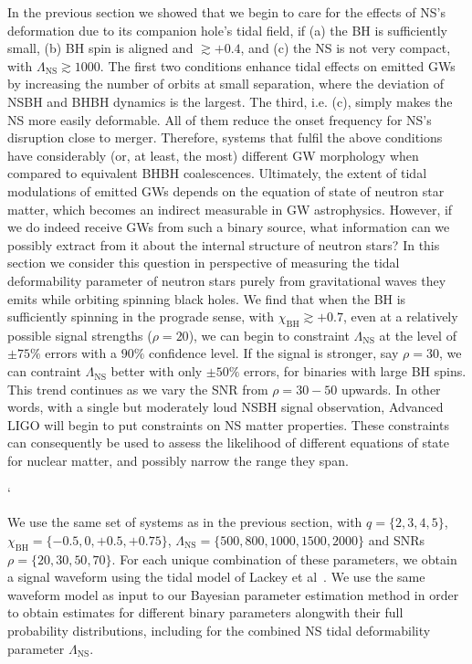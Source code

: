 \documentclass[aps,prd,amsmath,floats,floatfix, twocolumn,
superscriptaddress,nofootinbib,showpacs]{revtex4-1}
\newcommand{\lambdans}{\Lambda_\mathrm{NS}}
\newcommand{\chibh}{\chi_\mathrm{BH}}
\begin{document}
%
% 
In the previous section we showed that we begin to care for the effects of NS's
deformation due to its companion hole's tidal field, if (a) the BH is sufficiently
small, (b) BH spin is aligned and $\gtrsim +0.4$, and (c) the NS is
not very compact, with $\lambdans\gtrsim 1000$. The first two conditions
enhance tidal effects on emitted GWs by increasing the number of orbits at small
separation, where the deviation of NSBH and BHBH dynamics is the largest. The third,
i.e. (c), simply makes the NS more easily deformable. All of them reduce the onset 
frequency for NS's disruption close to merger. Therefore, systems that fulfil the 
above conditions have considerably (or, at least, the most) different GW morphology
when compared to equivalent BHBH coalescences. Ultimately, the extent of 
tidal modulations of emitted GWs depends on the equation of state of neutron star
matter, which becomes an indirect measurable in GW astrophysics.
% 
However, if we do indeed receive GWs from such a binary source, what information can we
possibly extract from it about the internal structure of neutron stars?
In this section we consider this question in perspective of measuring the tidal 
deformability parameter of neutron stars purely from gravitational waves they emits 
while orbiting spinning black holes.
% 
We find that when the BH is sufficiently spinning in the prograde sense,
with $\chibh\gtrsim +0.7$, even at a relatively possible signal strengths ($\rho=20$),
we can begin to constraint $\lambdans$ at the level of $\pm 75\%$ errors with a $90\%$
confidence level. If the signal is stronger, say $\rho=30$, we can contraint
$\lambdans$ better with only $\pm 50\%$ errors, for binaries with large BH spins.
This trend continues as we vary the SNR from $\rho=30-50$ upwards. In other words,
with a single but moderately loud NSBH signal observation, Advanced LIGO will begin
to put constraints on NS matter properties. These constraints can consequently
be used to assess the likelihood of different equations of state for nuclear
matter, and possibly narrow the range they span.

  `

We use the same set of systems as in the previous section, with $q=\{2,3,4,5\}$,
$\chibh=\{-0.5,0,+0.5,+0.75\}$, $\lambdans=\{500, 800, 1000, 1500, 2000\}$ and SNRs
$\rho=\{20,30,50,70\}$. For each unique combination of these parameters, we obtain a
signal waveform using the tidal model of Lackey et al~\cite{Lackey:2013axa}.
We use the same waveform model as input to our Bayesian parameter estimation
method in order to obtain estimates for different binary parameters alongwith 
their full probability distributions, including for the combined NS tidal
deformability parameter $\lambdans$.
\end{document}
